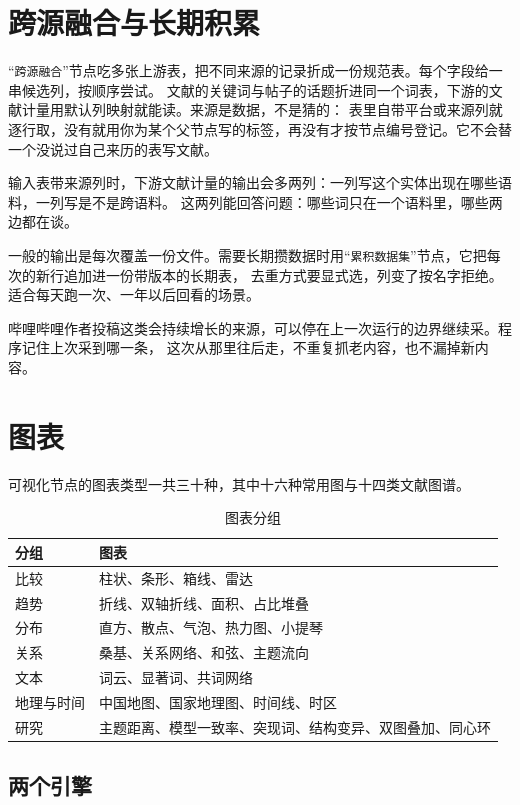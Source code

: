 \section{跨源融合与长期积累}

“\texttt{跨源融合}”节点吃多张上游表，把不同来源的记录折成一份规范表。每个字段给一串候选列，按顺序尝试。
文献的关键词与帖子的话题折进同一个词表，下游的文献计量用默认列映射就能读。来源是数据，不是猜的：
表里自带平台或来源列就逐行取，没有就用你为某个父节点写的标签，再没有才按节点编号登记。它不会替一个没说过自己来历的表写文献。

输入表带来源列时，下游文献计量的输出会多两列：一列写这个实体出现在哪些语料，一列写是不是跨语料。
这两列能回答问题：哪些词只在一个语料里，哪些两边都在谈。

一般的输出是每次覆盖一份文件。需要长期攒数据时用“\texttt{累积数据集}”节点，它把每次的新行追加进一份带版本的长期表，
去重方式要显式选，列变了按名字拒绝。适合每天跑一次、一年以后回看的场景。

哔哩哔哩作者投稿这类会持续增长的来源，可以停在上一次运行的边界继续采。程序记住上次采到哪一条，
这次从那里往后走，不重复抓老内容，也不漏掉新内容。

\section{图表}

可视化节点的图表类型一共三十种，其中十六种常用图与十四类文献图谱。

\begin{table}[H]\centering
\caption{图表分组}
\label{tab:charts}
\small
\begin{tabularx}{\textwidth}{p{2.4cm}X}
\toprule
分组 & 图表 \\
\midrule
比较 & 柱状、条形、箱线、雷达 \\
趋势 & 折线、双轴折线、面积、占比堆叠 \\
分布 & 直方、散点、气泡、热力图、小提琴 \\
关系 & 桑基、关系网络、和弦、主题流向 \\
文本 & 词云、显著词、共词网络 \\
地理与时间 & 中国地图、国家地理图、时间线、时区 \\
研究 & 主题距离、模型一致率、突现词、结构变异、双图叠加、同心环 \\
\bottomrule
\end{tabularx}
\end{table}

\subsection{两个引擎}

